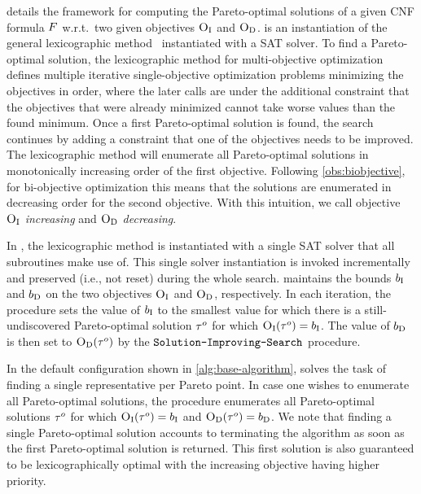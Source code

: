  details the \algname{} framework for computing the Pareto-optimal solutions of a given CNF formula $F$ w.r.t.\ two given objectives $\textsc{O}_{\text{I}}$ and $\textsc{O}_{\text{D}}$.
\algname{} is an instantiation of the general lexicographic method~\autocite{survey} instantiated with a SAT solver.
To find a Pareto-optimal solution, the lexicographic method for multi-objective optimization defines multiple iterative single-objective optimization problems minimizing the objectives in order, where the later calls are under the additional constraint that the objectives that were already minimized cannot take worse values than the found minimum.
Once a first Pareto-optimal solution is found, the search continues by adding a constraint that one of the objectives needs to be improved.
The lexicographic method will enumerate all Pareto-optimal solutions in monotonically increasing order of the first objective.
Following \cref{obs:biobjective}, for bi-objective optimization this means that the solutions are enumerated in decreasing order for the second objective.
With this intuition, we call objective $\textsc{O}_{\text{I}}$ \emph{increasing} and $\textsc{O}_{\text{D}}$ \emph{decreasing}.

In \algname{}, the lexicographic method is instantiated with a single SAT solver that all subroutines make use of.
This single solver instantiation is invoked incrementally and preserved (i.e., not reset) during the whole search. 
\algname{} maintains the bounds $b_{\text{I}}$ and $b_{\text{D}}$ on the two objectives $\textsc{O}_{\text{I}}$ and $\textsc{O}_{\text{D}}$, respectively.
In each iteration, the \Min{} procedure sets the value of $b_{\text{I}}$ to the smallest value for which there is a still-undiscovered Pareto-optimal solution $\tau^o$ for which $\textsc{O}_{\text{I}}(\tau^o) = b_{\text{I}}$.
The value of $b_{\text{D}}$ is then set to $\textsc{O}_{\text{D}}(\tau^o)$ by the $\texttt{Solution-\allowbreak{}Improving-\allowbreak{}Search}$ procedure.

In the default configuration shown in \cref{alg:base-algorithm}, \algname{} solves the task of finding a single representative per Pareto point.
In case one wishes to enumerate all Pareto-optimal solutions, the \E{} procedure enumerates all Pareto-optimal solutions $\tau^o$ for which $\textsc{O}_{\text{I}}(\tau^o) = b_{\text{I}}$ and $\textsc{O}_{\text{D}}(\tau^o) = b_{\text{D}}$.
We note that finding a single Pareto-optimal solution accounts to terminating the algorithm as soon as the first Pareto-optimal solution is returned.
This first solution is also guaranteed to be lexicographically optimal with the increasing objective having higher priority.

